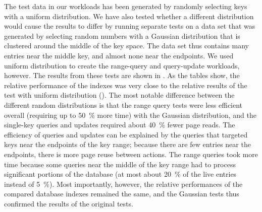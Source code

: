 The test data in our workloads has been generated by randomly
selecting keys with a uniform distribution. 
We have also tested whether a different distribution would cause
the results to differ by running separate tests on a data set that was
generated by selecting random numbers with a Gaussian distribution that is
clustered around the middle of the key space. 
The data set thus contains many entries near the middle key,
and almost none near the endpoints.
We used uniform distribution to create the range-query and query-update
workloads, however. 
The results from these tests are shown in
. 
As the tables show, the relative performance of the indexes was very close to
the relative results of the test with uniform distribution
().
The most notable difference between the different random distributions is
that the range query tests were less efficient overall (requiring up to
\SI{50}{\percent} more time) with the Gaussian distribution, and the
single-key queries and updates required about \SI{40}{\percent} fewer page
reads.
The efficiency of queries and updates can be explained by the queries
that targeted keys near the endpoints of the key range; because there
are few entries near the endpoints, there is more page reuse between
actions.
The range queries took more time because some queries near the middle
of the key range had to process significant portions of the database (at most
about \SI{20}{\percent} of the live entries instead of \SI{5}{\percent}). 
Most importantly, however, the relative performances of the compared database
indexes remained the same, and the Gaussian tests thus confirmed the results
of the original tests.
